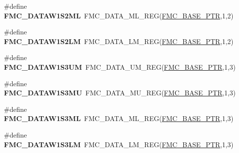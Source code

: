 \begin{DoxyCompactItemize}
\item 
\hypertarget{group___f_m_c___register___accessor___macros_gaee1ef90722baac1390b4b068167dab26}{}\#define {\bfseries F\+M\+C\+\_\+\+D\+A\+T\+A\+W1\+S2\+M\+L}~F\+M\+C\+\_\+\+D\+A\+T\+A\+\_\+\+M\+L\+\_\+\+R\+E\+G(\hyperlink{group___f_m_c___peripheral_ga0a740437b573e32e6b932bf729485fd9}{F\+M\+C\+\_\+\+B\+A\+S\+E\+\_\+\+P\+T\+R},1,2)\label{group___f_m_c___register___accessor___macros_gaee1ef90722baac1390b4b068167dab26}

\item 
\hypertarget{group___f_m_c___register___accessor___macros_gadd4180be889ff3bd3bae70f00fd57ac0}{}\#define {\bfseries F\+M\+C\+\_\+\+D\+A\+T\+A\+W1\+S2\+L\+M}~F\+M\+C\+\_\+\+D\+A\+T\+A\+\_\+\+L\+M\+\_\+\+R\+E\+G(\hyperlink{group___f_m_c___peripheral_ga0a740437b573e32e6b932bf729485fd9}{F\+M\+C\+\_\+\+B\+A\+S\+E\+\_\+\+P\+T\+R},1,2)\label{group___f_m_c___register___accessor___macros_gadd4180be889ff3bd3bae70f00fd57ac0}

\item 
\hypertarget{group___f_m_c___register___accessor___macros_ga8c4f01999c850b9f034d9d1c8eea564e}{}\#define {\bfseries F\+M\+C\+\_\+\+D\+A\+T\+A\+W1\+S3\+U\+M}~F\+M\+C\+\_\+\+D\+A\+T\+A\+\_\+\+U\+M\+\_\+\+R\+E\+G(\hyperlink{group___f_m_c___peripheral_ga0a740437b573e32e6b932bf729485fd9}{F\+M\+C\+\_\+\+B\+A\+S\+E\+\_\+\+P\+T\+R},1,3)\label{group___f_m_c___register___accessor___macros_ga8c4f01999c850b9f034d9d1c8eea564e}

\item 
\hypertarget{group___f_m_c___register___accessor___macros_ga6cbaf7d7f5688df394dd6d7b57830d48}{}\#define {\bfseries F\+M\+C\+\_\+\+D\+A\+T\+A\+W1\+S3\+M\+U}~F\+M\+C\+\_\+\+D\+A\+T\+A\+\_\+\+M\+U\+\_\+\+R\+E\+G(\hyperlink{group___f_m_c___peripheral_ga0a740437b573e32e6b932bf729485fd9}{F\+M\+C\+\_\+\+B\+A\+S\+E\+\_\+\+P\+T\+R},1,3)\label{group___f_m_c___register___accessor___macros_ga6cbaf7d7f5688df394dd6d7b57830d48}

\item 
\hypertarget{group___f_m_c___register___accessor___macros_gafdc7fb5dcb36d9748ffbbdd1f22adb7e}{}\#define {\bfseries F\+M\+C\+\_\+\+D\+A\+T\+A\+W1\+S3\+M\+L}~F\+M\+C\+\_\+\+D\+A\+T\+A\+\_\+\+M\+L\+\_\+\+R\+E\+G(\hyperlink{group___f_m_c___peripheral_ga0a740437b573e32e6b932bf729485fd9}{F\+M\+C\+\_\+\+B\+A\+S\+E\+\_\+\+P\+T\+R},1,3)\label{group___f_m_c___register___accessor___macros_gafdc7fb5dcb36d9748ffbbdd1f22adb7e}

\item 
\hypertarget{group___f_m_c___register___accessor___macros_gab82d7d6b1feb10372d5ff12aaf909718}{}\#define {\bfseries F\+M\+C\+\_\+\+D\+A\+T\+A\+W1\+S3\+L\+M}~F\+M\+C\+\_\+\+D\+A\+T\+A\+\_\+\+L\+M\+\_\+\+R\+E\+G(\hyperlink{group___f_m_c___peripheral_ga0a740437b573e32e6b932bf729485fd9}{F\+M\+C\+\_\+\+B\+A\+S\+E\+\_\+\+P\+T\+R},1,3)\label{group___f_m_c___register___accessor___macros_gab82d7d6b1feb10372d5ff12aaf909718}


\end{DoxyCompactItemize}
